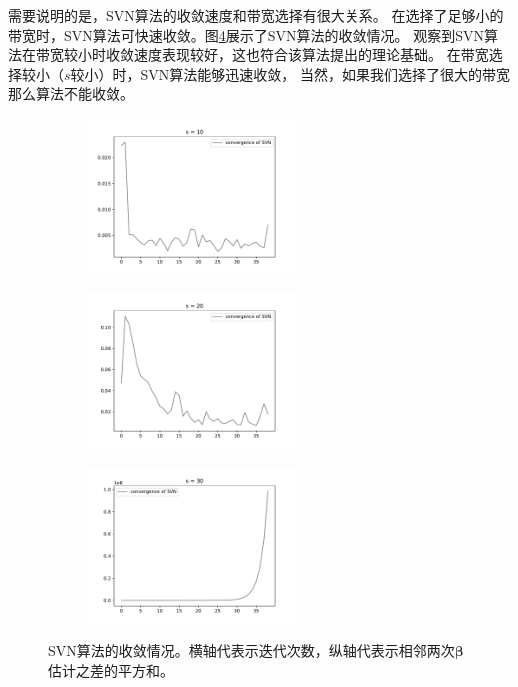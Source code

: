 需要说明的是，SVN算法的收敛速度和带宽选择有很大关系。
在选择了足够小的带宽时，SVN算法可快速收敛。图\ref{svn-demo}展示了SVN算法的收敛情况。
观察到SVN算法在带宽较小时收敛速度表现较好，这也符合该算法提出的理论基础。
在带宽选择较小（$s$较小）时，SVN算法能够迅速收敛，
当然，如果我们选择了很大的带宽那么算法不能收敛。
\begin{figure}[H]
    \centering
    \begin{subfigure}[t]{0.3\textwidth}\label{svn-demo1}
    \includegraphics[width=5.5cm]{pics/chapter2/svn-con-1.pdf}
    \end{subfigure}
    \begin{subfigure}[t]{0.3\textwidth}\label{svn-demo2}
    \includegraphics[width=5.5cm]{pics/chapter2/svn-con-2.pdf}
    \end{subfigure}
    \begin{subfigure}[t]{0.3\textwidth}\label{svn-demo3}
    \includegraphics[width=5.5cm]{pics/chapter2/svn-con-3.pdf}
    \end{subfigure}
    \caption{ \small SVN算法的收敛情况。横轴代表示迭代次数，纵轴代表示相邻两次$\bm{\beta}$估计之差的平方和。}
    \label{svn-demo}
\end{figure}

